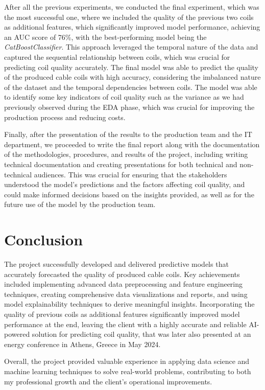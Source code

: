 After all the previous experiments, we conducted the final experiment, which
was the most successful one, where we included the quality of the previous two
coils as additional features, which significantly improved model performance,
achieving an AUC score of 76\%, with the best-performing model being the
\emph{CatBoostClassifier}. This approach leveraged the temporal nature of the
data and captured the sequential relationship between coils, which was crucial
for predicting coil quality accurately. The final model was able to predict the
quality of the produced cable coils with high accuracy, considering the
imbalanced nature of the dataset and the temporal dependencies between coils.
The model was able to identify some key indicators of coil quality such as the
variance as we had previously observed during the EDA phase, which was crucial
for improving the production process and reducing costs.

Finally, after the presentation of the results to the production team and the
IT department, we proceeded to write the final report along with the
documentation of the methodologies, procedures, and results of the project,
including writing technical documentation and creating presentations for both
technical and non-technical audiences. This was crucial for ensuring that the
stakeholders understood the model's predictions and the factors affecting coil
quality, and could make informed decisions based on the insights provided, as
well as for the future use of the model by the production team.

\section{Conclusion}

The project successfully developed and delivered predictive models that
accurately forecasted the quality of produced cable coils. Key achievements
included implementing advanced data preprocessing and feature engineering
techniques, creating comprehensive data visualizations and reports, and using
model explainability techniques to derive meaningful insights. Incorporating
the quality of previous coils as additional features significantly improved
model performance at the end, leaving the client with a highly accurate and
reliable AI-powered solution for predicting coil quality, that was later also
presented at an energy conference in Athens, Greece in May 2024.

Overall, the project provided valuable experience in applying data science and
machine learning techniques to solve real-world problems, contributing to both
my professional growth and the client's operational improvements.
